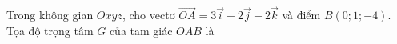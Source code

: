 \begin{ex}
Trong không gian $Oxyz$, cho vectơ $\overrightarrow{OA}=3\vec i-2\vec j-2\vec k$ và điểm $B(0;1;-4)$. Tọa độ trọng tâm $G$ của tam giác $OAB$ là
\end{ex}
